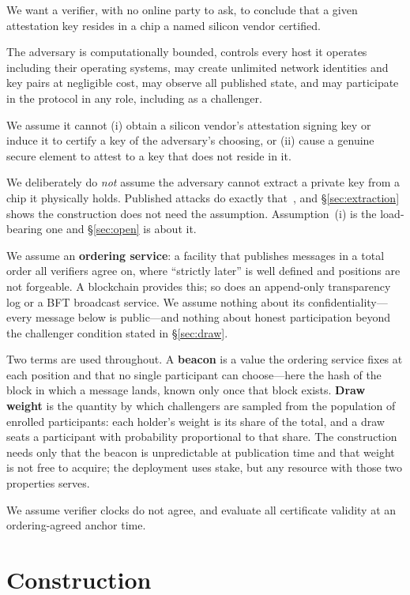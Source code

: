 \documentclass[conference,10pt]{IEEEtran}
\begin{document}
We want a verifier, with no online party to ask, to conclude that a given attestation key resides in a
chip a named silicon vendor certified.

The adversary is computationally bounded, controls every host it operates including their operating
systems, may create unlimited network identities and key pairs at negligible cost, may observe all
published state, and may participate in the protocol in any role, including as a challenger.

We assume it cannot (i) obtain a silicon vendor's attestation signing key or induce it to certify a key
of the adversary's choosing, or (ii) cause a genuine secure element to attest to a key that does not
reside in it.

We deliberately do \emph{not} assume the adversary cannot extract a private key from a chip it
physically holds. Published attacks do exactly that~\cite{faultpm,tpmfail}, and \S\ref{sec:extraction}
shows the construction does not need the assumption. Assumption~(i) is the load-bearing one and
\S\ref{sec:open} is about it.

We assume an \textbf{ordering service}: a facility that publishes messages in a total order all
verifiers agree on, where ``strictly later'' is well defined and positions are not forgeable. A
blockchain provides this; so does an append-only transparency log or a BFT broadcast service. We assume
nothing about its confidentiality---every message below is public---and nothing about honest
participation beyond the challenger condition stated in \S\ref{sec:draw}.

Two terms are used throughout. A \textbf{beacon} is a value the ordering service fixes at each position
and that no single participant can choose---here the hash of the block in which a message lands, known
only once that block exists. \textbf{Draw weight} is the quantity by which challengers are sampled from
the population of enrolled participants: each holder's weight is its share of the total, and a draw
seats a participant with probability proportional to that share. The construction needs only that the
beacon is unpredictable at publication time and that weight is not free to acquire; the deployment
uses stake, but any resource with those two properties serves.

We assume verifier clocks do not agree, and evaluate all certificate validity at an ordering-agreed
anchor time.

\section{Construction}
\label{sec:construction}
\end{document}
